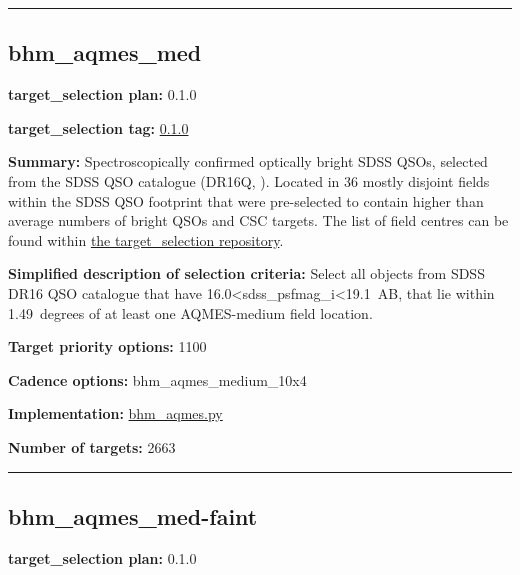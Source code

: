 \begin{center}\rule{0.5\linewidth}{0.5pt}\end{center}

\hypertarget{bhm_aqmes_med_plan0.1.0}{%
\subsection{bhm\_aqmes\_med}\label{bhm_aqmes_med_plan0.1.0}}

\noindent\textbf{target\_selection plan:} 0.1.0

\noindent\textbf{target\_selection tag:}
\href{https://github.com/sdss/target_selection/tree/0.1.0/}{0.1.0}

\noindent\textbf{Summary:} Spectroscopically confirmed optically bright SDSS
QSOs, selected from the SDSS QSO catalogue (DR16Q,
\citealt{Lyke2020}). Located in 36 mostly disjoint fields within the SDSS QSO
footprint that were pre-selected to contain higher than average numbers
of bright QSOs and CSC targets. The list of field centres can be found
within
\href{https://github.com/sdss/target_selection/blob/0.1.0/python/target_selection/masks/candidate_target_fields_bhm_aqmes_med_v0.2.1.fits}{the
target\_selection repository}.

\noindent\textbf{Simplified description of selection criteria:} Select all
objects from SDSS DR16 QSO catalogue that have
16.0\textless sdss\_psfmag\_i\textless19.1~AB, that lie within
1.49~degrees of at least one AQMES-medium field location.


\noindent\textbf{Target priority options:} 1100

\noindent\textbf{Cadence options:} bhm\_aqmes\_medium\_10x4

\noindent\textbf{Implementation:}
\href{https://github.com/sdss/target_selection/blob/0.1.0/python/target_selection/cartons/bhm_aqmes.py}{bhm\_aqmes.py}

\noindent\textbf{Number of targets:} 2663

\begin{center}\rule{0.5\linewidth}{0.5pt}\end{center}

\hypertarget{bhm_aqmes_med-faint_plan0.1.0}{%
\subsection{bhm\_aqmes\_med-faint}\label{bhm_aqmes_med-faint_plan0.1.0}}

\noindent\textbf{target\_selection plan:} 0.1.0

